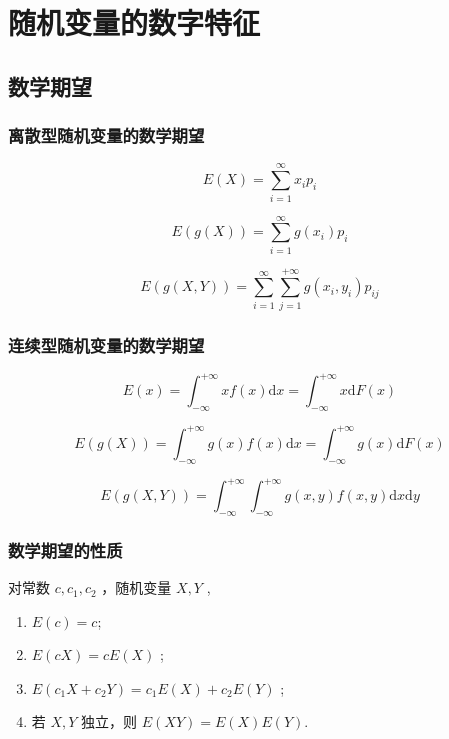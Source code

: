 \chapter{随机变量的数字特征}

\section{数学期望}

\subsection{离散型随机变量的数学期望}


$$
    E(X) = \sum_{i=1}^{\infty} x_ip_i
$$ 


$$
    E(g(X)) = \sum_{i=1}^{\infty} g(x_i)p_i
$$ 


$$
    E(g(X,Y)) = \sum_{i=1}^{\infty}\sum_{j=1}^{+\infty} g(x_i,y_i)p_{ij}
$$ 

\subsection{连续型随机变量的数学期望}


$$
    E(x) = \int_{-\infty}^{+\infty}xf(x)\mathrm{d}x = \int_{-\infty}^{+\infty}x\mathrm{d}F(x)
$$ 


$$
    E(g(X)) = \int_{-\infty}^{+\infty}g(x)f(x)\mathrm{d}x = \int_{-\infty}^{+\infty}g(x)\mathrm{d}F(x)
$$ 


$$
    E(g(X,Y)) = \int_{-\infty}^{+\infty}\int_{-\infty}^{+\infty}
    g(x,y)f(x,y)\mathrm{d}x\mathrm{d}y
$$ 

\subsection{数学期望的性质}

对常数 $ c,c_1,c_2 $ ，随机变量 $ X,Y $ ,
\begin{enumerate}
    \item $ E(c) = c $;
    \item $ E(cX) = cE(X) $ ;
    \item $ E(c_1X+c_2Y) = c_1E(X)+c_2E(Y) $ ;
    \item 若 $ X,Y $ 独立，则 $ E(XY) = E(X)E(Y) $.
\end{enumerate}


